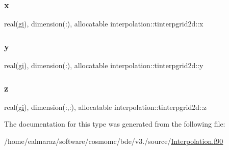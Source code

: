 \mbox{\label{structinterpolation_1_1tinterpgrid2d_a6e05188009018b495db7f12e2749b276}} 
\subsubsection{\texorpdfstring{x}{x}}
{\footnotesize\ttfamily real(\mbox{\hyperlink{namespaceinterpolation_a7242dea48715e8170bae81efe12c64be}{gi}}), dimension(\+:), allocatable interpolation\+::tinterpgrid2d\+::x}

\mbox{\label{structinterpolation_1_1tinterpgrid2d_a5a7e39cc77241b6edab46dd4bb3732b7}} 
\subsubsection{\texorpdfstring{y}{y}}
{\footnotesize\ttfamily real(\mbox{\hyperlink{namespaceinterpolation_a7242dea48715e8170bae81efe12c64be}{gi}}), dimension(\+:), allocatable interpolation\+::tinterpgrid2d\+::y}

\mbox{\label{structinterpolation_1_1tinterpgrid2d_ae77e52e5af5db7d55e24b8cb291ffbcb}} 
\subsubsection{\texorpdfstring{z}{z}}
{\footnotesize\ttfamily real(\mbox{\hyperlink{namespaceinterpolation_a7242dea48715e8170bae81efe12c64be}{gi}}), dimension(\+:,\+:), allocatable interpolation\+::tinterpgrid2d\+::z}



The documentation for this type was generated from the following file\+:\begin{DoxyCompactItemize}
\item 
/home/ealmaraz/software/cosmomc/bde/v3./source/\mbox{\hyperlink{Interpolation_8f90}{Interpolation.\+f90}}\end{DoxyCompactItemize}
